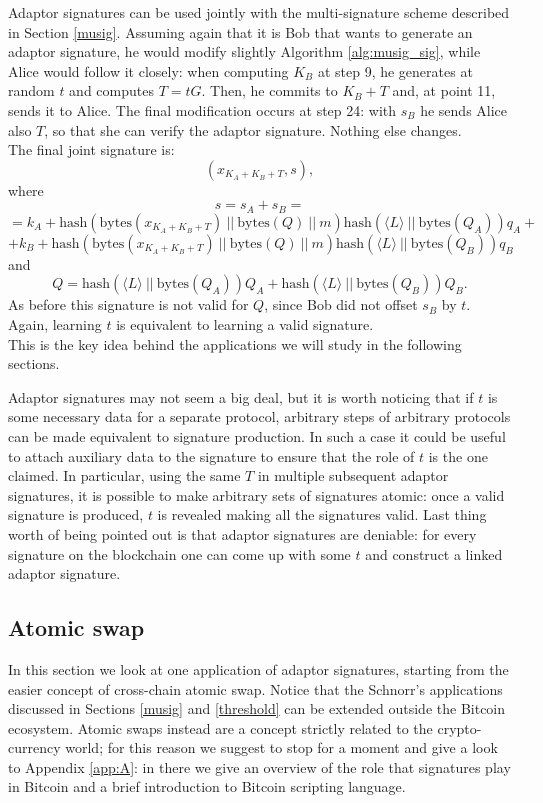 \bigskip
\noindent
Adaptor signatures can be used jointly with the multi-signature scheme described in Section \ref{musig}. Assuming again that it is Bob that wants to generate an adaptor signature, he would modify slightly Algorithm \ref{alg:musig_sig}, while Alice would follow it closely: when computing $K_B$ at step 9, he generates at random $t$ and computes $T = tG$. Then, he commits to $K_B + T$ and, at point 11, sends it to Alice. The final modification occurs at step 24: with $s_B$ he sends Alice also $T$, so that she can verify the adaptor signature. Nothing else changes. 
\\
The final joint signature is: 
$$(x_{K_A + K_B + T}, s),$$
where
$$s = s_A + s_B = $$
$$= k_A + \text{hash}(\text{bytes}(x_{K_A + K_B + T}) \ || \ \text{bytes}(Q) \ || \ m)\text{hash}(\langle L \rangle \ || \ \text{bytes}(Q_A))q_A + $$
$$+ k_B + \text{hash}(\text{bytes}(x_{K_A + K_B + T}) \ || \ \text{bytes}(Q) \ || \ m)\text{hash}(\langle L \rangle \ || \ \text{bytes}(Q_B))q_B$$ 
and
$$Q =  \text{hash}(\langle L \rangle \ || \ \text{bytes}(Q_A))Q_A + \text{hash}(\langle L \rangle \ || \ \text{bytes}(Q_B))Q_B.$$ 
As before this signature is not valid for $Q$, since Bob did not offset $s_B$ by $t$. Again, learning $t$ is equivalent to learning a valid signature.
\\
This is the key idea behind the applications we will study in the following sections.

\bigskip
\noindent
Adaptor signatures may not seem a big deal, but it is worth noticing that if $t$ is some necessary data for a separate protocol, arbitrary steps of arbitrary protocols can be made equivalent to signature production. In such a case it could be useful to attach auxiliary data to the signature to ensure that the role of $t$ is the one claimed. In particular, using the same $T$ in multiple subsequent adaptor signatures, it is possible to make arbitrary sets of signatures atomic: once a valid signature is produced, $t$ is revealed making all the signatures valid. Last thing worth of being pointed out is that adaptor signatures are deniable: for every signature on the blockchain one can come up with some $t$ and construct a linked adaptor signature.

\bigskip

\subsection{Atomic swap}
\label{atomic}
In this section we look at one application of adaptor signatures, starting from the easier concept of cross-chain atomic swap. Notice that the Schnorr's applications discussed in Sections \ref{musig} and \ref{threshold} can be extended outside the Bitcoin ecosystem. Atomic swaps instead are a concept strictly related to the crypto-currency world; for this reason we suggest to stop for a moment and give a look to Appendix \ref{app:A}: in there we give an overview of the role that signatures play in Bitcoin and a brief introduction to Bitcoin scripting language.

